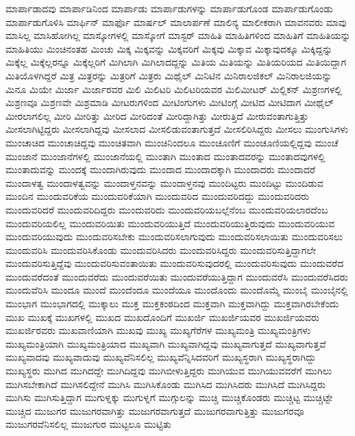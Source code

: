 {ಮಾರ್ಪಾಡಾದವು
ಮಾರ್ಪಾಡಿನಿಂದ
ಮಾರ್ಪಾಡು
ಮಾರ್ಪಾಡುಗಳನ್ನು
ಮಾರ್ಪಾಡುಗೊಂಡ
ಮಾರ್ಪಾಡುಗೊಂಡು
ಮಾರ್ಪಾಡುಗೊಳಿಸಿ
ಮಾರ್ಫಿನ್
ಮಾರ್ಫೊ
ಮಾರ್ಷಲ್
ಮಾಲಾರ್ಪಣೆ
ಮಾಲಿನ್ಯ
ಮಾಲೀಕರಾಗಿ
ಮಾವನವರು
ಮಾವು
ಮಾಸಿಲ್ಲ
ಮಾಸಿಹೋಗಿಲ್ಲ
ಮಾಸ್ಕೋಗಳಲ್ಲಿ
ಮಾಸ್ಕೋಗೆ
ಮಾಸ್ಟರ್
ಮಾಹಿತಿ
ಮಾಹಿತಿಗಳಿಂದ
ಮಾಹಿತಿಗೆ
ಮಾಹಿತಿಯನ್ನು
ಮಾಹಿತಿಯು
ಮಿಂಚಿನಂತಹ
ಮಿಂಚು
ಮಿಕ್ಕ
ಮಿಕ್ಕವನ್ನು
ಮಿಕ್ಕವರಿಗೆ
ಮಿಕ್ಕವು
ಮಿಕ್ಕಾವ
ಮಿಕ್ಕಾವುದಕ್ಕೂ
ಮಿಕ್ಕಿದ್ದನ್ನು
ಮಿಕ್ಕೆಲ್ಲ
ಮಿಕ್ಕೆಲ್ಲರನ್ನೂ
ಮಿಕ್ಕೆಲ್ಲರಿಗೆ
ಮಿಗಿಲಾಗಿ
ಮಿಗಿಲಾದದ್ದನ್ನು
ಮಿತಿಯ
ಮಿತಿಯನ್ನು
ಮಿತಿಯರಿಯದ
ಮಿತಿಯಿದ್ದಾಗ
ಮಿತಿಯೊಳಗಿದ್ದರೆ
ಮಿತ್ರ
ಮಿತ್ರರನ್ನು
ಮಿತ್ರರಿಗೆ
ಮಿತ್ರರು
ಮಿಥೈಲ್
ಮಿನಿಟಿನ
ಮಿನಿರಾಲಜಿಕಲ್
ಮಿನಿರಾಲಜಿಯನ್ನು
ಮಿನೂ
ಮಿಯೇ
ಮಿರ್ಜಾ
ಮಿರ್ಜಾರವರ
ಮಿಲಿ
ಮಿಲಿಟರಿ
ಮಿಲಿಟರಿಯವರ
ಮಿಲಿಮೀಟರ್
ಮಿಲ್ಲಿಕನ್
ಮಿಶ್ರಣಗಳಲ್ಲಿ
ಮಿಶ್ರಣವೂ
ಮಿಶ್ರಣವೇ
ಮಿಶ್ರಮಾಡಿ
ಮೀಟರುಗಳಿಂದ
ಮೀಟಿಂಗುಗಳು
ಮೀಟಿಂಗ್ಗೆ
ಮೀಟಿದ
ಮೀಟಿದಾಗ
ಮೀಥೈಲ್
ಮೀರಲಾಗಲಿಲ್ಲ
ಮೀರಿ
ಮೀರಿತ್ತು
ಮೀರಿದ
ಮೀರಿದಂತೆ
ಮೀರಿದ್ದಾಗಿತ್ತು
ಮೀರುತ್ತಿದೆ
ಮೀರುವಂತಾಗುತ್ತಿತ್ತು
ಮೀಸಲಾಗಿಟ್ಟಿದ್ದರು
ಮೀಸಲಾಗಿದ್ದವು
ಮೀಸಲಾದ
ಮೀಸಲಿಡುವಂತಾಗುತ್ತದೆ
ಮೀಸಲಿರಿಸಿದ್ದರು
ಮೀಸಲು
ಮುಂಗುಸಿಗಳು
ಮುಂಚಾಚಿದ
ಮುಂಚಾಚಿದ್ದವು
ಮುಂಚಿತವಾಗಿ
ಮುಂಚಿನಿಂದಲೂ
ಮುಂಚೂಣಿಗೆ
ಮುಂಚೂಣಿಯಲ್ಲಿದ್ದವು
ಮುಂಚೆ
ಮುಂಜಾನೆ
ಮುಂಜಾನೆಗಳಲ್ಲಿ
ಮುಂಜಾನೆಯಲ್ಲಿ
ಮುಂತಾಗಿ
ಮುಂತಾದ
ಮುಂತಾದವರನ್ನು
ಮುಂತಾದವುಗಳಲ್ಲಿ
ಮುಂತಾದುವನ್ನು
ಮುಂದಕ್ಕೆ
ಮುಂದಾಗಿರುವುದು
ಮುಂದಾದ
ಮುಂದಾದಕ್ಕಾಗಿ
ಮುಂದಾದರು
ಮುಂದಾದರೆ
ಮುಂದಾಳತ್ವ
ಮುಂದಾಳತ್ವವನ್ನು
ಮುಂದಾಳ್ತನವನ್ನು
ಮುಂದಾಳ್ತನವು
ಮುಂದಿಟ್ಟರು
ಮುಂದಿಟ್ಟು
ಮುಂದಿಡುವ
ಮುಂದಿನ
ಮುಂದುವರಿಕೆಯ
ಮುಂದುವರಿಕೆಯಾಗಿ
ಮುಂದುವರಿದ
ಮುಂದುವರಿದದ್ದು
ಮುಂದುವರಿದರು
ಮುಂದುವರಿದರೆ
ಮುಂದುವರಿದಿದ್ದರು
ಮುಂದುವರಿದು
ಮುಂದುವರಿಯಬಲ್ಲೆನೆಂಬ
ಮುಂದುವರಿಯಲಾರದೆಂಬ
ಮುಂದುವರಿಯಲಿಲ್ಲ
ಮುಂದುವರಿಯಿತು
ಮುಂದುವರಿಯುತ್ತಿದೆ
ಮುಂದುವರಿಯುತ್ತಿರುವುದು
ಮುಂದುವರಿಯುವ
ಮುಂದುವರಿಯುವುದು
ಮುಂದುವರಿಸಬೇಕು
ಮುಂದುವರಿಸಲಾಗುವುದು
ಮುಂದುವರಿಸಲಾಯಿತು
ಮುಂದುವರಿಸಲು
ಮುಂದುವರಿಸಿ
ಮುಂದುವರಿಸಿಕೊಂಡು
ಮುಂದುವರಿಸಿದರು
ಮುಂದುವರಿಸಿದ್ದರು
ಮುಂದುವರಿಸುತ್ತಿದ್ದಾಗಲೇ
ಮುಂದುವರಿಸುತ್ತಿದ್ದೆವು
ಮುಂದುವರಿಸುವಂತಾಯಿತು
ಮುಂದುವರಿಸುವುದರಲ್ಲಿ
ಮುಂದುವರಿಸುವುದು
ಮುಂದುವರೆದ
ಮುಂದುವರೆದಂತೆ
ಮುಂದುವರೆದು
ಮುಂದುವರೆಯಿತು
ಮುಂದುವರೆಯುತ್ತಿದ್ದಾಗ
ಮುಂದುವರೆಸಿ
ಮುಂದುವರೆಸಿದರು
ಮುಂದುವೆರಿಸಿ
ಮುಂದೂ
ಮುಂದೆ
ಮುಂದೆಂದೂ
ಮುಂದೆಯೂ
ಮುಂದೊಂದು
ಮುಂದೊಮ್ಮೆ
ಮುಂಬೈ
ಮುಂಬೈನಲ್ಲಿ
ಮುಂಭಾಗ
ಮುಂಭಾಗದಲ್ಲಿ
ಮುಕ್ಕಾಲು
ಮುಕ್ತ
ಮುಕ್ತಕಂಠದಿಂದ
ಮುಕ್ತವಾಗಿ
ಮುಕ್ತವಾಗಿದ್ದು
ಮುಕ್ತವಾಗಿರಬೇಕೆಂದು
ಮುಖ
ಮುಖಕ್ಕೆ
ಮುಖಗಳಲ್ಲಿ
ಮುಖದ
ಮುಖದೊಂದಿಗೆ
ಮುಖರ್ಜಿ
ಮುಖರ್ಜಿಯವರ
ಮುಖರ್ಜಿಯವರು
ಮುಖರ್ಜಿರವರು
ಮುಖವಾಣಿಯಾಗಿ
ಮುಖವು
ಮುಖ್ಯ
ಮುಖ್ಯಗೆರೆಗಳ
ಮುಖ್ಯಮಂತ್ರಿ
ಮುಖ್ಯಮಂತ್ರಿಗಳು
ಮುಖ್ಯಮಂತ್ರಿಯಾಗಿ
ಮುಖ್ಯಮಂತ್ರಿಯಾದ
ಮುಖ್ಯವಾಗಿ
ಮುಖ್ಯವಾಗಿದ್ದವು
ಮುಖ್ಯವಾಗುತ್ತದೆ
ಮುಖ್ಯವಾಗುತ್ತವೆ
ಮುಖ್ಯವಾದವು
ಮುಖ್ಯವಾದುವು
ಮುಖ್ಯವೆನಿಸಲಿಲ್ಲ
ಮುಖ್ಯವೆನ್ನಿಸಿದವರಿಗೆ
ಮುಖ್ಯಸ್ಥರಾಗಿ
ಮುಖ್ಯಸ್ಥರಾಗಿದ್ದು
ಮುಖ್ಯಸ್ಥರು
ಮುಗಿದ
ಮುಗಿದದ್ದೇ
ಮುಗಿದಿದ್ದವು
ಮುಗಿಬೀಳುತ್ತಿದ್ದರು
ಮುಗಿಯುವ
ಮುಗಿಯುವವರೆಗೆ
ಮುಗಿಲು
ಮುಗಿಸಬೇಕಾಗಿದೆ
ಮುಗಿಸಲಿದ್ದೇನೆ
ಮುಗಿಸಿ
ಮುಗಿಸಿಕೊಂಡು
ಮುಗಿಸಿದ
ಮುಗಿಸಿದರು
ಮುಗಿಸಿದೆ
ಮುಗಿಸಿದ್ದರು
ಮುಗಿಸು
ಮುಗಿಸುತ್ತಿದ್ದಾಗ
ಮುಗುಳ್ನಕ್ಕು
ಮುಗುಳ್ನಗೆ
ಮುಗ್ಗುಲನ್ನು
ಮುಚ್ಚಿ
ಮುಚ್ಚಿಕೊಂಡರು
ಮುಚ್ಚಿಟ್ಟ
ಮುಚ್ಚಿಟ್ಟೇ
ಮುಚ್ಚಿದ
ಮುಜುಗರ
ಮುಜುಗರವಾಗಿತ್ತು
ಮುಜುಗರವಾಗುತ್ತದೆ
ಮುಜುಗರವಾಗುತ್ತಿತ್ತು
ಮುಜುಗರವೂ
ಮುಜುಗರವೆನಿಸಲಿಲ್ಲ
ಮುಜುಗುರ
ಮುಟ್ಟಲೂ
ಮುಟ್ಟಿತು
}
